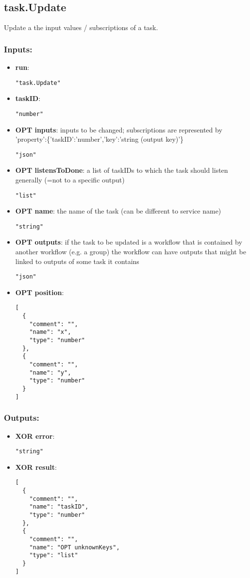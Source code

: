 \subsection{task.Update}
Update a the input values / subscriptions of a task.
\subsubsection*{Inputs:}
\begin{itemize}
    \item \textbf{run}: 
\begin{lstlisting}
"task.Update"
\end{lstlisting}
    \item \textbf{taskID}: 
\begin{lstlisting}
"number"
\end{lstlisting}
    \item \textbf{OPT inputs}: inputs to be changed; subscriptions are represented by 'property':\{'taskID':'number','key':'string (output key)'\}
\begin{lstlisting}
"json"
\end{lstlisting}
    \item \textbf{OPT listensToDone}: a list of taskIDs to which the task should listen generally (=not to a specific output)
\begin{lstlisting}
"list"
\end{lstlisting}
    \item \textbf{OPT name}: the name of the task (can be different to service name)
\begin{lstlisting}
"string"
\end{lstlisting}
    \item \textbf{OPT outputs}: if the task to be updated is a workflow that is contained by another  workflow (e.g. a group) the workflow can have outputs that might be  linked to outputs of some task it contains
\begin{lstlisting}
"json"
\end{lstlisting}
    \item \textbf{OPT position}: 
\begin{lstlisting}
[
  {
    "comment": "", 
    "name": "x", 
    "type": "number"
  }, 
  {
    "comment": "", 
    "name": "y", 
    "type": "number"
  }
]
\end{lstlisting}
  \end{itemize}

\subsubsection*{Outputs:}
\begin{itemize}
    \item \textbf{XOR error}: 
\begin{lstlisting}
"string"
\end{lstlisting}
    \item \textbf{XOR result}: 
\begin{lstlisting}
[
  {
    "comment": "", 
    "name": "taskID", 
    "type": "number"
  }, 
  {
    "comment": "", 
    "name": "OPT unknownKeys", 
    "type": "list"
  }
]
\end{lstlisting}
  \end{itemize}

